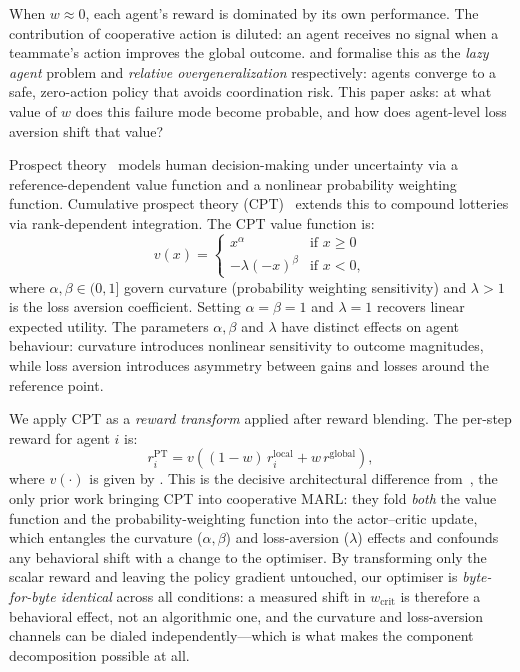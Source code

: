 \documentclass[letterpaper]{article}
\theoremstyle{plain}
\newcommand{\wcrit}{w_{\mathrm{crit}}}
\newcommand{\PT}{\mathrm{PT}}
\begin{document}
When $w \approx 0$, each agent's reward is dominated by its own
performance.
The contribution of cooperative action is diluted: an agent receives no
signal when a teammate's action improves the global outcome.
\citet{liu2023lazy} and \citet{peng2023curo} formalise this as the
\emph{lazy agent} problem and \emph{relative overgeneralization}
respectively: agents converge to a safe, zero-action policy that avoids
coordination risk.
This paper asks: at what value of $w$ does this failure mode become
probable, and how does agent-level loss aversion shift that value?

Prospect theory~\citep{kahneman1979} models human decision-making under
uncertainty via a reference-dependent value function and a nonlinear
probability weighting function.
Cumulative prospect theory (CPT)~\citep{tversky1992} extends this to
compound lotteries via rank-dependent integration.
The CPT value function is:
\begin{equation}
  v(x) =
  \begin{cases}
    x^{\alpha} & \text{if } x \geq 0 \\
    -\lambda(-x)^{\beta} & \text{if } x < 0,
  \end{cases}
  \label{eq:cpt}
\end{equation}
where $\alpha, \beta \in (0,1]$ govern curvature (probability weighting
sensitivity) and $\lambda > 1$ is the loss aversion coefficient.
Setting $\alpha{=}\beta{=}1$ and $\lambda{=}1$ recovers linear expected
utility.
The parameters $\alpha, \beta$ and $\lambda$ have distinct effects on
agent behaviour: curvature introduces nonlinear sensitivity to outcome
magnitudes, while loss aversion introduces asymmetry between gains and
losses around the reference point.

We apply CPT as a \emph{reward transform} applied after reward blending.
The per-step reward for agent $i$ is:
\begin{equation}
  r_i^{\PT} = v\!\left((1-w)\,r_i^{\mathrm{local}} + w\,r^{\mathrm{global}}\right),
  \label{eq:reward}
\end{equation}
where $v(\cdot)$ is given by .
This is the decisive architectural difference from~\citet{lalmohammed2025}, the
only prior work bringing CPT into cooperative MARL: they fold \emph{both} the
value function and the probability-weighting function into the actor--critic
update, which entangles the curvature ($\alpha,\beta$) and loss-aversion
($\lambda$) effects and confounds any behavioral shift with a change to the
optimiser. By transforming only the scalar reward and leaving the policy gradient
untouched, our optimiser is \emph{byte-for-byte identical} across all conditions:
a measured shift in $\wcrit$ is therefore a behavioral effect, not an algorithmic
one, and the curvature and loss-aversion channels can be dialed independently---which
is what makes the component decomposition possible at all.
\end{document}
